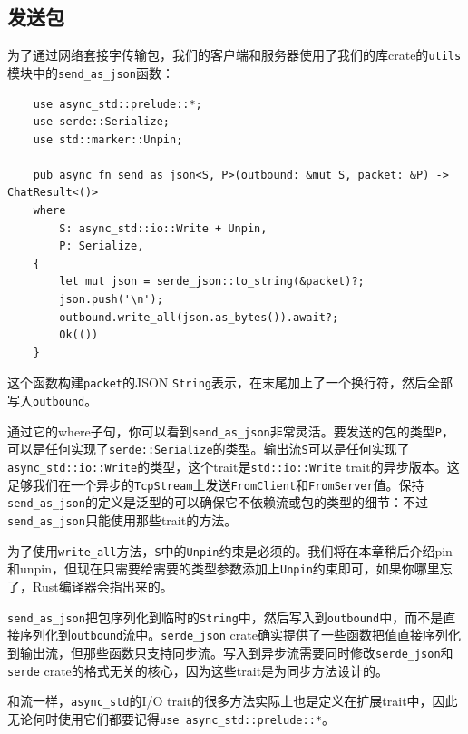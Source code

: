 \subsection{发送包}
为了通过网络套接字传输包，我们的客户端和服务器使用了我们的库crate的\texttt{utils}模块中的\texttt{send\_as\_json}函数：
\begin{verbatim}
    use async_std::prelude::*;
    use serde::Serialize;
    use std::marker::Unpin;

    pub async fn send_as_json<S, P>(outbound: &mut S, packet: &P) -> ChatResult<()>
    where
        S: async_std::io::Write + Unpin,
        P: Serialize,
    {
        let mut json = serde_json::to_string(&packet)?;
        json.push('\n');
        outbound.write_all(json.as_bytes()).await?;
        Ok(())
    }
\end{verbatim}

这个函数构建\texttt{packet}的JSON \texttt{String}表示，在末尾加上了一个换行符，然后全部写入\texttt{outbound}。

通过它的where子句，你可以看到\texttt{send\_as\_json}非常灵活。要发送的包的类型\texttt{P}，可以是任何实现了\texttt{serde::Serialize}的类型。输出流\texttt{S}可以是任何实现了\texttt{async\_std::io::Write}的类型，这个trait是\texttt{std::io::Write} trait的异步版本。这足够我们在一个异步的\texttt{TcpStream}上发送\texttt{FromClient}和\texttt{FromServer}值。保持\texttt{send\_as\_json}的定义是泛型的可以确保它不依赖流或包的类型的细节：不过\texttt{send\_as\_json}只能使用那些trait的方法。

为了使用\texttt{write\_all}方法，\texttt{S}中的\texttt{Unpin}约束是必须的。我们将在本章稍后介绍pin和unpin，但现在只需要给需要的类型参数添加上\texttt{Unpin}约束即可，如果你哪里忘了，Rust编译器会指出来的。

\texttt{send\_as\_json}把包序列化到临时的\texttt{String}中，然后写入到\texttt{outbound}中，而不是直接序列化到\texttt{outbound}流中。\texttt{serde\_json} crate确实提供了一些函数把值直接序列化到输出流，但那些函数只支持同步流。写入到异步流需要同时修改\texttt{serde\_json}和\texttt{serde} crate的格式无关的核心，因为这些trait是为同步方法设计的。

和流一样，\texttt{async\_std}的I/O trait的很多方法实际上也是定义在扩展trait中，因此无论何时使用它们都要记得\texttt{use async\_std::prelude::*}。

